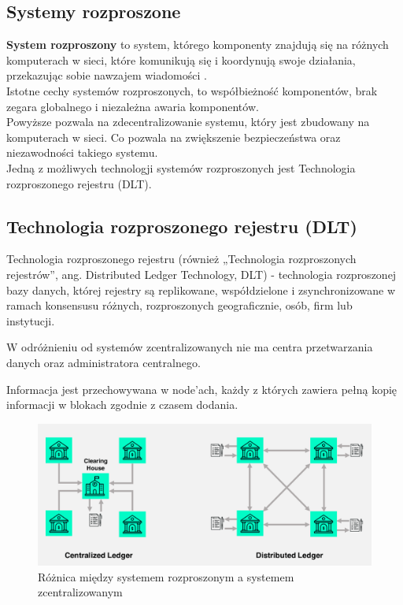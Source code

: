 \documentclass[12pt]{article}
\newenvironment{centerfig}
{\begin{figure}[H]\centering}
{\end{figure}}
\begin{document}
\subsection{Systemy rozproszone}

\textbf{System rozproszony} to system, którego komponenty znajdują się na różnych komputerach w sieci, które komunikują się i koordynują swoje działania, przekazując sobie nawzajem wiadomości \cite{wiki-sr}. \\
Istotne cechy systemów rozproszonych, to współbieżność komponentów, brak zegara globalnego i niezależna awaria komponentów. \\
Powyższe pozwala na zdecentralizowanie systemu, który jest zbudowany na komputerach w sieci. Co pozwala na zwiększenie bezpieczeństwa oraz niezawodności takiego systemu.\\
Jedną z możliwych technologji systemów rozproszonych jest Technologia rozproszonego rejestru (DLT). \\
\subsection{Technologia rozproszonego rejestru (DLT)}
Technologia rozproszonego rejestru (również „Technologia rozproszonych rejestrów”, ang. Distributed Ledger Technology, DLT) - technologia rozproszonej bazy danych, której rejestry są replikowane, współdzielone i zsynchronizowane w ramach konsensusu różnych, rozproszonych geograficznie, osób, firm lub instytucji. \cite{wiki-dlt}

W odróżnieniu od systemów zcentralizowanych nie ma centra przetwarzania danych oraz administratora centralnego.

Informacja jest przechowywana w node'ach, każdy z których zawiera pełną kopię informacji w blokach zgodnie z czasem dodania.

\begin{centerfig}
  \includegraphics[width=\textwidth]{1.png}
  \caption{Różnica między systemem rozproszonym a systemem zcentralizowanym \cite{sceta}}
\end{centerfig}
\end{document}

